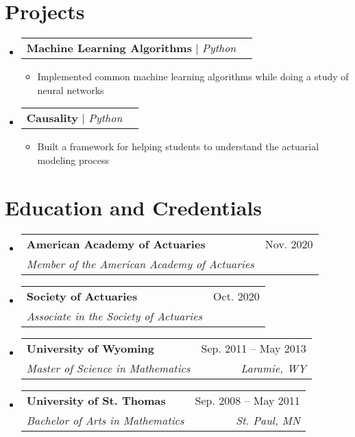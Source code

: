 \documentclass[letterpaper,11pt]{article}
\makeatletter
\newcommand{\resumeItem}[1]{
  \item\small{
    {#1 \vspace{-2pt}}
  }
}
\newcommand{\resumeSubheading}[4]{
  \vspace{-2pt}\item
    \begin{tabular*}{0.97\textwidth}[t]{l@{\extracolsep{\fill}}r}
      \textbf{#1} & #2 \\
      \textit{\small#3} & \textit{\small #4} \\
    \end{tabular*}\vspace{-7pt}
}
\newcommand{\resumeProjectHeading}[2]{
    \item
    \begin{tabular*}{0.97\textwidth}{l@{\extracolsep{\fill}}r}
      \small#1 & #2 \\
    \end{tabular*}\vspace{-7pt}
}
\newcommand{\resumeSubHeadingListStart}{\begin{itemize}[leftmargin=0.15in, label={}]}
\newcommand{\resumeSubHeadingListEnd}{\end{itemize}}
\newcommand{\resumeItemListStart}{\begin{itemize}}
\newcommand{\resumeItemListEnd}{\end{itemize}\vspace{-5pt}}
\makeatother
\begin{document}
\section{Projects}
    \resumeSubHeadingListStart
 	\resumeProjectHeading         
          {\textbf{Machine Learning Algorithms} $|$ \emph{Python}}{}
          \resumeItemListStart
            \resumeItem{Implemented common machine learning algorithms while doing a study of neural networks}
          \resumeItemListEnd
          
         \resumeProjectHeading         
          {\textbf{Causality} $|$ \emph{Python}}{}
          \resumeItemListStart
            \resumeItem{Built a framework for helping students to understand the actuarial modeling process}
          \resumeItemListEnd
          
          
    \resumeSubHeadingListEnd

\section{Education and Credentials}
  \resumeSubHeadingListStart
      \resumeSubheading
      {American Academy of Actuaries}{Nov. 2020}
      {Member of the American Academy of Actuaries}{}
      \resumeSubheading
      {Society of Actuaries}{Oct. 2020}
      {Associate in the Society of Actuaries}{}
    \resumeSubheading
      {University of Wyoming}{Sep. 2011 -- May 2013}
      {Master of Science in Mathematics}{Laramie, WY}
    \resumeSubheading
      {University of St. Thomas}{Sep. 2008 -- May 2011}
      {Bachelor of Arts in Mathematics}{St. Paul, MN}
  \resumeSubHeadingListEnd

\end{document}
